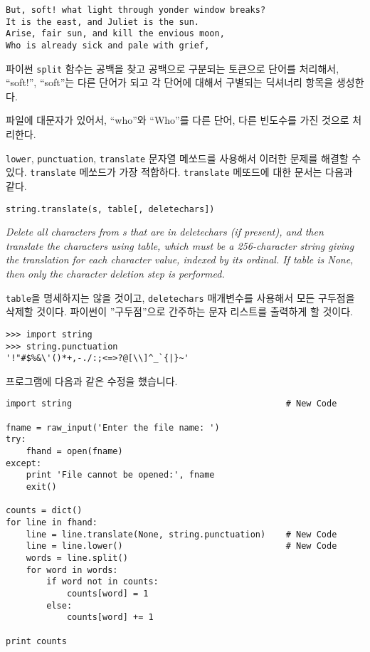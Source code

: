 \beforeverb
\begin{verbatim}
But, soft! what light through yonder window breaks?
It is the east, and Juliet is the sun.
Arise, fair sun, and kill the envious moon,
Who is already sick and pale with grief,
\end{verbatim}
\afterverb
%

파이썬 {\tt split} 함수는 공백을 찾고 공백으로 구분되는 토큰으로 단어를 처리해서, ``soft!'', ``soft''는 다른 단어가 되고
각 단어에 대해서 구별되는 딕셔너리 항목을 생성한다.

파일에 대문자가 있어서, ``who''와 ``Who''를 다른 단어, 다른 빈도수를 가진 것으로 처리한다.

{\tt lower}, {\tt punctuation}, {\tt translate} 문자열 메쏘드를 사용해서 이러한 문제를 해결할 수 있다.
{\tt translate} 메쏘드가 가장 적합하다. {\tt translate} 메또드에 대한 문서는 다음과 같다.


\verb"string.translate(s, table[, deletechars])"

\emph{Delete all characters from s that are in deletechars (if present), 
and then translate the characters using table, which must 
be a 256-character string giving the translation for each 
character value, indexed by its ordinal. If table is None, 
then only the character deletion step is performed.}


{\tt table}을 명세하지는 않을 것이고, {\tt deletechars} 매개변수를 사용해서 모든 구두점을 삭제할 것이다.
파이썬이 ''구두점''으로 간주하는 문자 리스트를 출력하게 할 것이다.


\beforeverb
\begin{verbatim}
>>> import string
>>> string.punctuation
'!"#$%&\'()*+,-./:;<=>?@[\\]^_`{|}~'
\end{verbatim}
\afterverb
%

프로그램에 다음과 같은 수정을 했습니다.

\beforeverb
\begin{verbatim}
import string                                          # New Code

fname = raw_input('Enter the file name: ')
try:
    fhand = open(fname)
except:
    print 'File cannot be opened:', fname
    exit()

counts = dict()
for line in fhand:
    line = line.translate(None, string.punctuation)    # New Code
    line = line.lower()                                # New Code
    words = line.split()
    for word in words:
        if word not in counts:
            counts[word] = 1
        else:
            counts[word] += 1

print counts
\end{verbatim}
\afterverb
%

